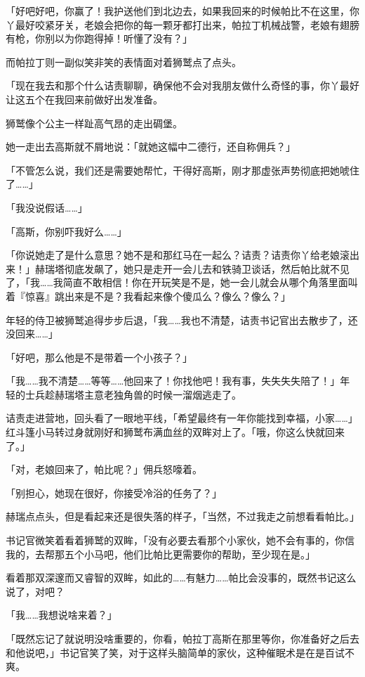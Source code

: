 「好吧好吧，你赢了！我护送他们到北边去，如果我回来的时候帕比不在这里，你丫最好咬紧牙关，老娘会把你的每一颗牙都打出来，帕拉丁机械战警，老娘有翅膀有枪，你别以为你跑得掉！听懂了没有？」

而帕拉丁则一副似笑非笑的表情面对着狮鹫点了点头。

「现在我去和那个什么诘责聊聊，确保他不会对我朋友做什么奇怪的事，你丫最好让这五个在我回来前做好出发准备。

狮鹫像个公主一样趾高气昂的走出碉堡。

她一走出去高斯就不屑地说：「就她这幅中二德行，还自称佣兵？」

「不管怎么说，我们还是需要她帮忙，干得好高斯，刚才那虚张声势彻底把她唬住了……」

「我没说假话……」

「高斯，你别吓我好么……」

\horizonline


「你说她走了是什么意思？她不是和那红马在一起么？诘责？诘责你丫给老娘滚出来！」赫瑞塔彻底发飙了，她只是走开一会儿去和铁骑卫谈话，然后帕比就不见了，「我……我简直不敢相信！你在开玩笑是不是，她一会儿就会从哪个角落里面叫着『惊喜』跳出来是不是？我看起来像个傻瓜么？像么？像么？」

年轻的侍卫被狮鹫追得步步后退，「我……我也不清楚，诘责书记官出去散步了，还没回来……」

「好吧，那么他是不是带着一个小孩子？」

「我……我不清楚……等等……他回来了！你找他吧！我有事，失失失失陪了！」年轻的士兵趁赫瑞塔主意老独角兽的时候一溜烟逃走了。

诘责走进营地，回头看了一眼地平线，「希望最终有一年你能找到幸福，小家……」红斗篷小马转过身就刚好和狮鹫布满血丝的双眸对上了。「哦，你这么快就回来了。」

「对，老娘回来了，帕比呢？」佣兵怒嚎着。

「别担心，她现在很好，你接受冷浴的任务了？」

赫瑞点点头，但是看起来还是很失落的样子，「当然，不过我走之前想看看帕比。」

书记官微笑着看着狮鹫的双眸，「没有必要去看那个小家伙，她不会有事的，你信我的，去帮那五个小马吧，他们比帕比更需要你的帮助，至少现在是。」

看着那双深邃而又睿智的双眸，如此的……有魅力……帕比会没事的，既然书记这么说了，对吧？

「我……我想说啥来着？」

「既然忘记了就说明没啥重要的，你看，帕拉丁高斯在那里等你，你准备好之后去和他说吧，」书记官笑了笑，对于这样头脑简单的家伙，这种催眠术是在是百试不爽。

